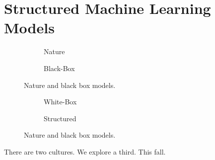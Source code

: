 \section{Structured Machine Learning Models}
\begin{figure}[t]
    \begin{subfigure}[b]{\halffigurewidth}
        \centering
        \caption{
            \label{fig:introduction:models:nature}
            Nature
        }
    \end{subfigure}
    \hfill
    \begin{subfigure}[b]{\halffigurewidth}
        \centering
        \caption{
            \label{fig:introduction:models:black_box}
            Black-Box
        }
    \end{subfigure}
    \caption{
        \label{fig:introduction:models:one}
        Nature and black box models.
    }
\end{figure}
\begin{figure}[t]
    \begin{subfigure}[b]{\halffigurewidth}
        \centering
        \caption{
            \label{fig:introduction:models:white_box}
            White-Box
        }
    \end{subfigure}
    \hfill
    \begin{subfigure}[b]{\halffigurewidth}
        \centering
        \caption{
            \label{fig:introduction:models:structured}
            Structured
        }
    \end{subfigure}
    \caption{
        \label{fig:introduction:models:two}
        Nature and black box models.
    }
\end{figure}
There are two cultures.
We explore a third.
This fall.

